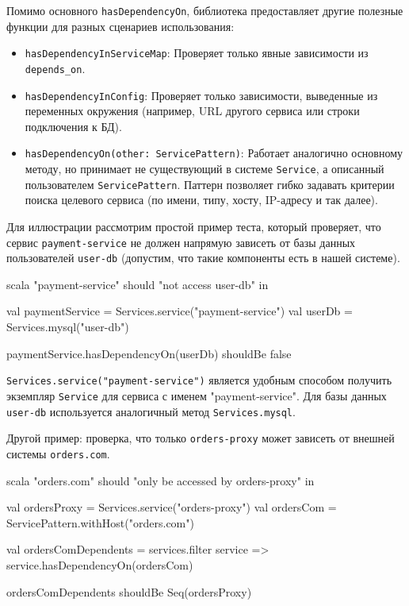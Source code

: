 Помимо основного \verb|hasDependencyOn|, библиотека предоставляет другие полезные функции для разных сценариев использования:

\begin{itemize}
    \item \verb|hasDependencyInServiceMap|: Проверяет только явные зависимости из \verb|depends_on|.
    \item \verb|hasDependencyInConfig|: Проверяет только зависимости, выведенные из переменных окружения (например, URL другого сервиса или строки подключения к БД).
    \item \verb|hasDependencyOn(other: ServicePattern)|: Работает аналогично основному методу, но принимает не существующий в системе \verb|Service|, а описанный пользователем \verb|ServicePattern|. Паттерн позволяет гибко задавать критерии поиска целевого сервиса (по имени, типу, хосту, IP-адресу и так далее).
\end{itemize}

Для иллюстрации рассмотрим простой пример теста, который проверяет, что сервис \verb|payment-service| не должен напрямую зависеть от базы данных пользователей \verb|user-db| (допустим, что такие компоненты есть в нашей системе).

\begin{code}{scala}
"payment-service" should "not access user-db" in {
  val paymentService = Services.service("payment-service")
  val userDb = Services.mysql("user-db")

  paymentService.hasDependencyOn(userDb) shouldBe false
}
\end{code}

\verb|Services.service("payment-service")| является удобным способом получить экземпляр \verb|Service| для сервиса с именем "payment-service". Для базы данных \verb|user-db| используется аналогичный метод \verb|Services.mysql|.

Другой пример: проверка, что только \verb|orders-proxy| может зависеть от внешней системы \verb|orders.com|.

\begin{code}{scala}
"orders.com" should "only be accessed by orders-proxy" in {
  val ordersProxy = Services.service("orders-proxy")
  val ordersCom = ServicePattern.withHost("orders.com")

  val ordersComDependents = services.filter { service =>
    service.hasDependencyOn(ordersCom)
  }

  ordersComDependents shouldBe Seq(ordersProxy)
}
\end{code}

